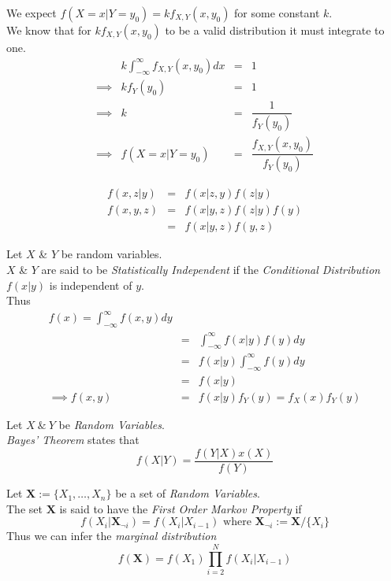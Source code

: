 \documentclass[11pt,a4paper]{article}
\begin{document}
We expect $f(X=x|Y=y_0)=kf_{X,Y}(x,y_0)$ for some constant $k$.\\
We know that for $kf_{X,Y}(x,y_0)$ to be a valid distribution it must integrate to one.
\[\begin{array}{rrcl}
&k\displaystyle\int_{-\infty}^\infty f_{X,Y}(x,y_0)dx&=&1\\
\implies&kf_Y(y_0)&=&1\\
\implies&k&=&\dfrac{1}{f_Y(y_0)}\\
\implies&f(X=x|Y=y_0)&=&\dfrac{f_{X,Y}(x,y_0)}{f_Y(y_0)}
\end{array}\]

\[\begin{array}{rcl}
f(x,z|y)&=&f(x|z,y)f(z|y)\\
f(x,y,z)&=&f(x|y,z)f(z|y)f(y)\\
&=&f(x|y,z)f(y,z)
\end{array}\]

Let $X$ \& $Y$ be random variables.\\
$X$ \& $Y$ are said to be \textit{Statistically Independent} if the \textit{Conditional Distribution} $f(x|y)$ is independent of $y$.\\
Thus
\[\begin{array}{rcl}
f(x)=\displaystyle\int_{-\infty}^\infty f(x,y)dy\\
&=&\displaystyle\int_{-\infty}^\infty f(x|y)f(y)dy\\
&=&f(x|y)\displaystyle\int_{-\infty}^\infty f(y)dy\\
&=&f(x|y)\\
\implies f(x,y)&=&f(x|y)f_Y(y)=f_X(x)f_Y(y)
\end{array}\]

Let $X\ \&\ Y$ be \textit{Random Variables}.\\
\textit{Bayes' Theorem} states that
$$f(X|Y)=\dfrac{f(Y|X)x(X)}{f(Y)}$$

Let $\textbf{X}:=\{X_1,\dots,X_n\}$ be a set of \textit{Random Variables}.\\
The set $\textbf{X}$ is said to have the \textit{First Order Markov Property} if
$$f(X_i|\textbf{X}_{\neg i})= f(X_i|X_{i-1})\text{ where }\textbf{X}_{\neg i}:=\textbf{X}/\{X_i\}$$
Thus we can infer the \textit{marginal distribution}
$$f(\textbf{X})=f(X_1)\prod_{i=2}^Nf(X_i|X_{i-1})$$
\end{document}
